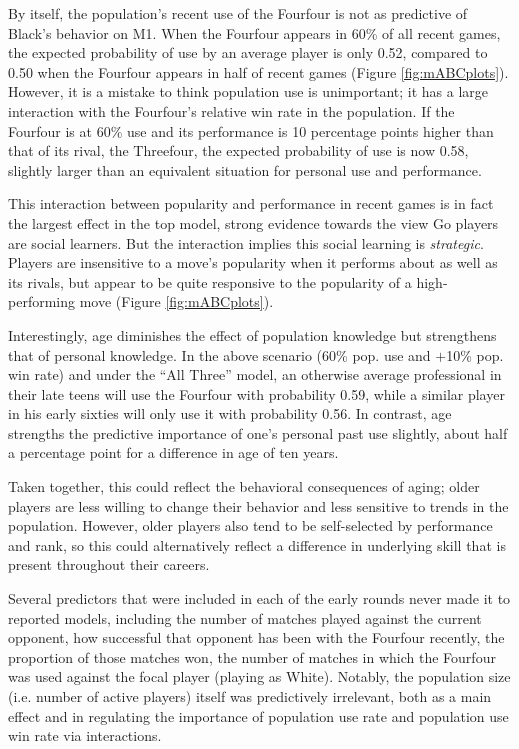 By itself, the population's recent use of the Fourfour is not as predictive of Black's behavior on M1.  When the Fourfour appears in 60\% of all recent games, the expected probability of use by an average player is only 0.52, compared to 0.50 when the Fourfour appears in half of recent games (Figure \ref{fig:mABCplots}).  However, it is a mistake to think population use is unimportant; it has a large interaction with the Fourfour's relative win rate in the population.  If the Fourfour is at 60\% use and its performance is 10 percentage points higher than that of its rival, the Threefour, the expected probability of use is now 0.58, slightly larger than an equivalent situation for personal use and performance.  

This interaction between popularity and performance in recent games is in fact the largest effect in the top model, strong evidence towards the view Go players are social learners.  But the interaction implies this social learning is \textit{strategic}.  Players are insensitive to a move's popularity when it performs about as well as its rivals, but appear to be quite responsive to the popularity of a high-performing move (Figure \ref{fig:mABCplots}). 

Interestingly, age diminishes the effect of population knowledge but strengthens that of personal knowledge.  In the above scenario (60\% pop. use and $+$10\% pop. win rate) and under the ``All Three'' model, an otherwise average professional in their late teens will use the Fourfour with probability 0.59, while a similar player in his early sixties will only use it with probability 0.56.  In contrast, age strengths the predictive importance of one's personal past use slightly, about half a percentage point for a difference in age of ten years.  

Taken together, this could reflect the behavioral consequences of aging; older players are less willing to change their behavior and less sensitive to trends in the population.  However, older players also tend to be self-selected by performance and rank, so this could alternatively reflect a difference in underlying skill that is present throughout their careers.

Several predictors that were included in each of the early rounds never made it to reported models, including the number of matches played against the current opponent, how successful that opponent has been with the Fourfour recently, the proportion of those matches won, the number of matches in which the Fourfour was used against the focal player (playing as White).  Notably, the population size (i.e. number of active players) itself was predictively irrelevant, both as a main effect and in regulating the importance of population use rate and population use win rate via interactions.

